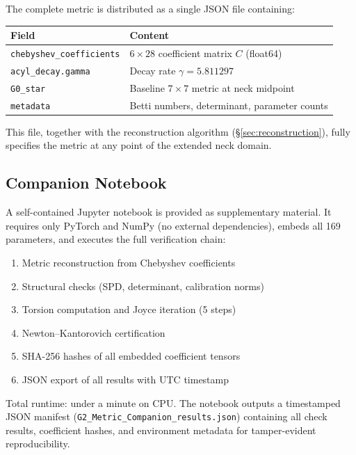 \documentclass[11pt,a4paper]{article}
\theoremstyle{remark}
\begin{document}
The complete metric is distributed as a single JSON file containing:

\begin{table}[H]
\centering
\begin{tabular}{ll}
\toprule
\textbf{Field} & \textbf{Content} \\
\midrule
\texttt{chebyshev\_coefficients} & $6 \times 28$ coefficient matrix $C$ (float64) \\
\texttt{acyl\_decay.gamma} & Decay rate $\gamma = 5.811297$ \\
\texttt{G0\_star} & Baseline $7 \times 7$ metric at neck midpoint \\
\texttt{metadata} & Betti numbers, determinant, parameter counts \\
\bottomrule
\end{tabular}
\end{table}

This file, together with the reconstruction algorithm (\S\ref{sec:reconstruction}), fully specifies the
metric at any point of the extended neck domain.

\subsection{Companion Notebook}\label{sec:notebook}

A self-contained Jupyter notebook is provided as supplementary material. It requires
only PyTorch and NumPy (no external dependencies), embeds all 169 parameters, and
executes the full verification chain:

\begin{enumerate}
    \item Metric reconstruction from Chebyshev coefficients
    \item Structural checks (SPD, determinant, calibration norms)
    \item Torsion computation and Joyce iteration (5 steps)
    \item Newton--Kantorovich certification
    \item SHA-256 hashes of all embedded coefficient tensors
    \item JSON export of all results with UTC timestamp
\end{enumerate}

Total runtime: under a minute on CPU. The notebook outputs a timestamped JSON
manifest (\texttt{G2\_Metric\_Companion\_results.json}) containing all check results,
coefficient hashes, and environment metadata for tamper-evident reproducibility.
\end{document}
